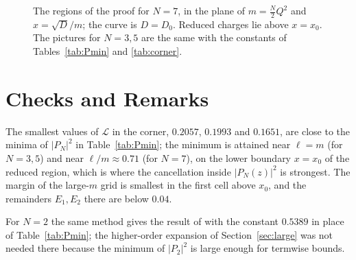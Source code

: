 \documentclass[11pt]{amsart}
\numberwithin{equation}{section}
\theoremstyle{plain}
\theoremstyle{definition}
\theoremstyle{remark}
\newcommand{\cL}{\mathcal{L}}
\begin{document}
\begin{figure}[t]
\centering
{}
\caption{The regions of the proof for $N=7$, in the plane of $m=\frac N2Q^2$ and $x=\sqrt D/m$; the curve is $D=D_0$. Reduced charges lie above $x=x_0$. The pictures for $N=3,5$ are the same with the constants of Tables~\ref{tab:Pmin} and \ref{tab:corner}.}
\label{fig:regions}
\end{figure}

\section{Checks and Remarks}\label{sec:checks}

The smallest values of $\cL$ in the corner, $0.2057$, $0.1993$ and $0.1651$, are close to the minima of $|P_N|^2$ in Table~\ref{tab:Pmin}; the minimum is attained near $\ell=m$ (for $N=3,5$) and near $\ell/m\approx0.71$ (for $N=7$), on the lower boundary $x=x_0$ of the reduced region, which is where the cancellation inside $|P_N(z)|^2$ is strongest. The margin of the large-$m$ grid is smallest in the first cell above $x_0$, and the remainders $E_1,E_2$ there are below $0.04$.

For $N=2$ the same method gives the result of \cite{Bha26a} with the constant $0.5389$ in place of Table~\ref{tab:Pmin}; the higher-order expansion of Section~\ref{sec:large} was not needed there because the minimum of $|P_2|^2$ is large enough for termwise bounds.
\end{document}
